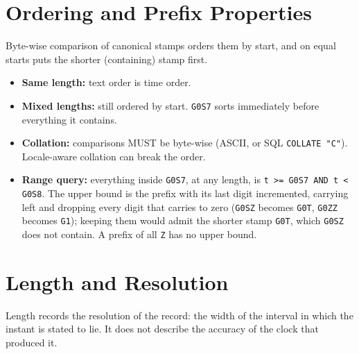\documentclass[11pt]{article}
\newcommand{\lit}[1]{\texttt{#1}}
\begin{document}
\section{Ordering and Prefix Properties}\label{sec:ordering}

Byte-wise comparison of canonical stamps orders them by start, and on equal
starts puts the shorter (containing) stamp first.

\begin{itemize}
\item \textbf{Same length:} text order is time order.
\item \textbf{Mixed lengths:} still ordered by start. \lit{G0S7} sorts
immediately before everything it contains.
\item \textbf{Collation:} comparisons MUST be byte-wise (ASCII, or SQL
\lit{COLLATE "C"}). Locale-aware collation can break the order.
\item \textbf{Range query:} everything inside \lit{G0S7}, at any length, is
\lit{t >= \textquotesingle G0S7\textquotesingle{} AND t < \textquotesingle G0S8\textquotesingle}. The upper bound is the prefix with its last
digit incremented, carrying left and dropping every digit that carries to zero
(\lit{G0SZ} becomes \lit{G0T}, \lit{G0ZZ} becomes \lit{G1}); keeping them
would admit the shorter stamp \lit{G0T}, which \lit{G0SZ} does not contain. A
prefix of all \lit{Z} has no upper bound.
\end{itemize}

\section{Length and Resolution}\label{sec:resolution}

Length records the resolution of the record: the width of the interval in
which the instant is stated to lie. It does not describe the accuracy of the
clock that produced it.
\end{document}
